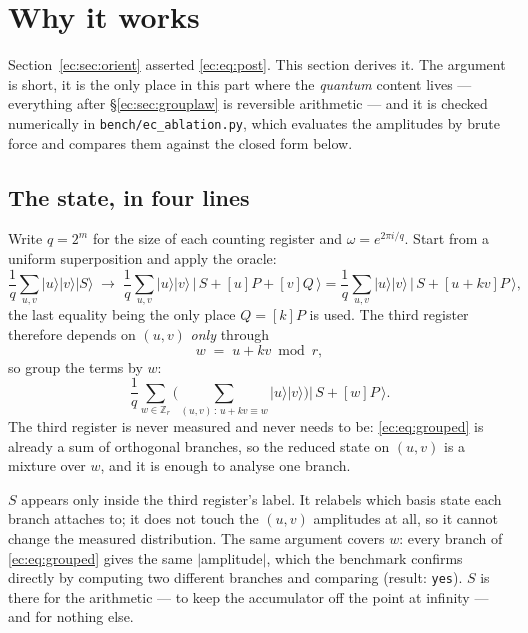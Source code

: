 \documentclass[11pt]{article}
\renewcommand{\ket}[1]{\lvert #1 \rangle}
\newcommand{\code}[1]{\texttt{#1}}
\theoremstyle{plain}
\theoremstyle{remark}
\begin{document}
\section{Why it works}\label{ec:sec:why}

Section~\ref{ec:sec:orient} asserted \eqref{ec:eq:post}. This section derives it. The argument is
short, it is the only place in this part where the \emph{quantum} content lives --- everything after
\S\ref{ec:sec:grouplaw} is reversible arithmetic --- and it is checked numerically in
\code{bench/ec\_ablation.py}, which evaluates the amplitudes by brute force and compares them
against the closed form below.

\subsection{The state, in four lines}

Write $q=2^m$ for the size of each counting register and $\omega=e^{2\pi i/q}$. Start from a uniform
superposition and apply the oracle:
\[
\frac1q\sum_{u,v}\ket u\ket v\ket S
\;\longrightarrow\;
\frac1q\sum_{u,v}\ket u\ket v\,\big|\,S+[u]P+[v]Q\,\big\rangle
=\frac1q\sum_{u,v}\ket u\ket v\,\big|\,S+[u+kv]P\,\big\rangle ,
\]
the last equality being the only place $Q=[k]P$ is used. The third register therefore depends on
$(u,v)$ \emph{only} through
\[
w \;=\; u+kv \bmod r ,
\]
so group the terms by $w$:
\begin{equation}\label{ec:eq:grouped}
\frac1q\sum_{w\in\mathbb{Z}_r}\Bigg(\sum_{(u,v)\,:\,u+kv\equiv w}\ket u\ket v\Bigg)\big|\,S+[w]P\,\big\rangle .
\end{equation}
The third register is never measured and never needs to be: \eqref{ec:eq:grouped} is already a sum
of orthogonal branches, so the reduced state on $(u,v)$ is a mixture over $w$, and it is enough to
analyse one branch.

\begin{keybox}[title={Why the offset $S$ cannot matter}]
$S$ appears only inside the third register's label. It relabels which basis state each branch
attaches to; it does not touch the $(u,v)$ amplitudes at all, so it cannot change the measured
distribution. The same argument covers $w$: every branch of \eqref{ec:eq:grouped} gives the same
$|$amplitude$|$, which the benchmark confirms directly by computing two different branches and
comparing (result: \code{yes}). $S$ is there for the arithmetic --- to keep the
accumulator off the point at infinity --- and for nothing else.
\end{keybox}
\end{document}
